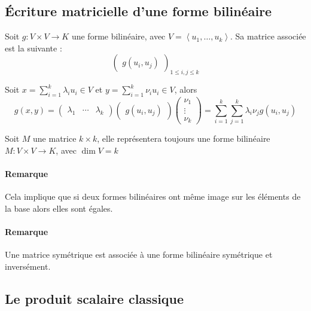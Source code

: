 \documentclass[a4paper,10pt]{article}
\newcommand{\ap}{ \rightarrow} %
\newcommand{\grp}[1]{\left\langle #1 \right\rangle} %
\begin{document}
  \subsection{Écriture matricielle d'une forme bilinéaire}
   Soit $g:V\times V\ap K$ une forme bilinéaire, avec $V=\grp{u_1,\hdots, u_k}$. Sa matrice associée est la suivante :
    $$\begin{pmatrix}
       g(u_i,u_j)
      \end{pmatrix}_{1\leq i,j \leq k}
    $$

   Soit $x=\sum^{k}_{i=1}\lambda_i u_i \in V$ et $y=\sum^{k}_{i=1} \nu_i u_i \in V$, alors
    $$g(x,y)=
     \begin{pmatrix}
      \lambda_1 & \cdots & \lambda_k
     \end{pmatrix}
     \begin{pmatrix}
      g(u_i,u_j)
     \end{pmatrix}
     \begin{pmatrix}
      \nu_1\\
      \vdots\\
      \nu_k
     \end{pmatrix}
     =\sum^{k}_{i=1}\sum^{k}_{j=1} \lambda_i \nu_j g(u_i,u_j)
    $$

    Soit $M$ une matrice $k\times k$, elle représentera toujours une forme bilinéaire $M:V\times V\ap K$, avec $\dim V=k$

    \paragraph{Remarque} Cela implique que si deux formes bilinéaires ont même image sur les éléments de la base alors elles sont égales.

    \paragraph{Remarque} Une matrice symétrique est associée à une forme bilinéaire symétrique et inversément.
 
  \subsection{Le produit scalaire classique}
\end{document}
